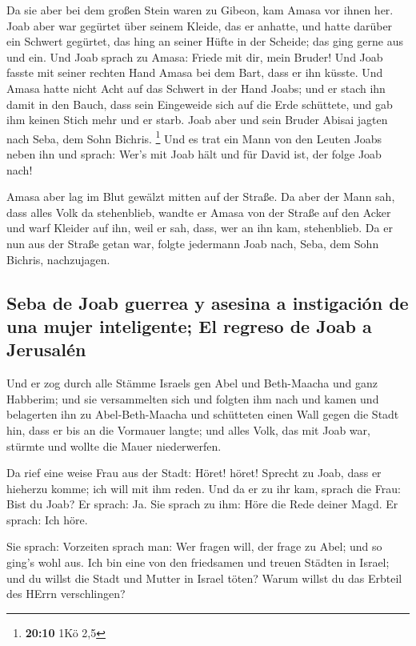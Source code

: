  Da sie aber bei dem großen Stein waren zu Gibeon, kam
Amasa vor ihnen her. Joab aber war gegürtet über seinem Kleide, das er
anhatte, und hatte darüber ein Schwert gegürtet, das hing an seiner
Hüfte in der Scheide; das ging gerne aus und ein.  Und
Joab sprach zu Amasa: Friede mit dir, mein Bruder! Und Joab fasste mit
seiner rechten Hand Amasa bei dem Bart, dass er ihn küsste.
 Und Amasa hatte nicht Acht auf das Schwert in der Hand
Joabs; und er stach ihn damit in den Bauch, dass sein Eingeweide sich
auf die Erde schüttete, und gab ihm keinen Stich mehr und er starb. Joab
aber und sein Bruder Abisai jagten nach Seba, dem Sohn Bichris.
\footnote{\textbf{20:10} 1Kö 2,5}  Und es trat ein Mann
von den Leuten Joabs neben ihn und sprach: Wer's mit Joab hält und für
David ist, der folge Joab nach!

 Amasa aber lag im Blut gewälzt mitten auf der Straße. Da
aber der Mann sah, dass alles Volk da stehenblieb, wandte er Amasa von
der Straße auf den Acker und warf Kleider auf ihn, weil er sah, dass,
wer an ihn kam, stehenblieb.  Da er nun aus der Straße
getan war, folgte jedermann Joab nach, Seba, dem Sohn Bichris,
nachzujagen.

\hypertarget{seba-de-joab-guerrea-y-asesina-a-instigaciuxf3n-de-una-mujer-inteligente-el-regreso-de-joab-a-jerusaluxe9n}{%
\subsection{Seba de Joab guerrea y asesina a instigación de una mujer
inteligente; El regreso de Joab a
Jerusalén}\label{seba-de-joab-guerrea-y-asesina-a-instigaciuxf3n-de-una-mujer-inteligente-el-regreso-de-joab-a-jerusaluxe9n}}

 Und er zog durch alle Stämme Israels gen Abel und
Beth-Maacha und ganz Habberim; und sie versammelten sich und folgten ihm
nach  und kamen und belagerten ihn zu Abel-Beth-Maacha
und schütteten einen Wall gegen die Stadt hin, dass er bis an die
Vormauer langte; und alles Volk, das mit Joab war, stürmte und wollte
die Mauer niederwerfen.

 Da rief eine weise Frau aus der Stadt: Höret! höret!
Sprecht zu Joab, dass er hieherzu komme; ich will mit ihm reden.
 Und da er zu ihr kam, sprach die Frau: Bist du Joab? Er
sprach: Ja. Sie sprach zu ihm: Höre die Rede deiner Magd. Er sprach: Ich
höre.

 Sie sprach: Vorzeiten sprach man: Wer fragen will, der
frage zu Abel; und so ging's wohl aus.  Ich bin eine von
den friedsamen und treuen Städten in Israel; und du willst die Stadt und
Mutter in Israel töten? Warum willst du das Erbteil des HErrn
verschlingen?

